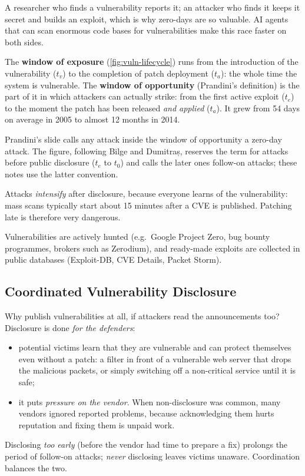 A researcher who finds a vulnerability reports it; an attacker who finds it keeps it secret and builds an exploit, which is why zero-days are so valuable. AI agents that can scan enormous code bases for vulnerabilities make this race faster on both sides.

\begin{definition}
The \textbf{window of exposure} (\cref{fig:vuln-lifecycle}) runs from the introduction of the vulnerability ($t_v$) to the completion of patch deployment ($t_a$): the whole time the system is vulnerable. The \textbf{window of opportunity} (Prandini's definition) is the part of it in which attackers can actually strike: from the first active exploit ($t_e$) to the moment the patch has been released \emph{and applied} ($t_a$). It grew from 54 days on average in 2005 to almost 12 months in 2014.
\end{definition}

\begin{remark}
Prandini's slide calls any attack inside the window of opportunity a zero-day attack. The figure, following Bilge and Dumitraș, reserves the term for attacks before public disclosure ($t_e$ to $t_0$) and calls the later ones follow-on attacks; these notes use the latter convention.
\end{remark}

\begin{remark}
Attacks \emph{intensify} after disclosure, because everyone learns of the vulnerability: mass scans typically start about 15 minutes after a CVE is published. Patching late is therefore very dangerous.
\end{remark}

Vulnerabilities are actively hunted (e.g.\ Google Project Zero, bug bounty programmes, brokers such as Zerodium), and ready-made exploits are collected in public databases (Exploit-DB, CVE Details, Packet Storm).

\subsection{Coordinated Vulnerability Disclosure}

Why publish vulnerabilities at all, if attackers read the announcements too? Disclosure is done \emph{for the defenders}:
\begin{itemize}
    \item potential victims learn that they are vulnerable and can protect themselves even without a patch: a filter in front of a vulnerable web server that drops the malicious packets, or simply switching off a non-critical service until it is safe;
    \item it puts \emph{pressure on the vendor}. When non-disclosure was common, many vendors ignored reported problems, because acknowledging them hurts reputation and fixing them is unpaid work.
\end{itemize}
Disclosing \emph{too early} (before the vendor had time to prepare a fix) prolongs the period of follow-on attacks; \emph{never} disclosing leaves victims unaware. Coordination balances the two.

